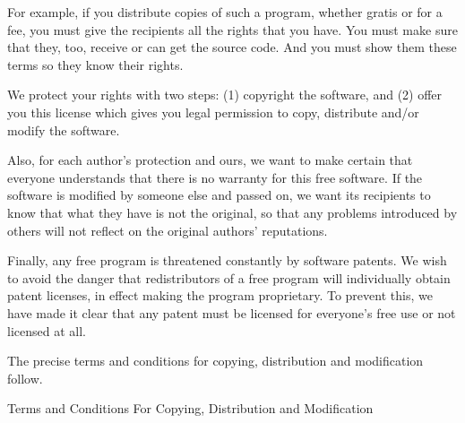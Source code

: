 \documentclass[12pt,a4paper]{article}
\begin{document}
For example, if you distribute copies of such a program, whether gratis or
for a fee, you must give the recipients all the rights that you have.  You
must make sure that they, too, receive or can get the source code.  And
you must show them these terms so they know their rights.

We protect your rights with two steps: (1) copyright the software, and (2)
offer you this license which gives you legal permission to copy,
distribute and/or modify the software.

Also, for each author's protection and ours, we want to make certain that
everyone understands that there is no warranty for this free software.  If
the software is modified by someone else and passed on, we want its
recipients to know that what they have is not the original, so that any
problems introduced by others will not reflect on the original authors'
reputations.

Finally, any free program is threatened constantly by software patents.
We wish to avoid the danger that redistributors of a free program will
individually obtain patent licenses, in effect making the program
proprietary.  To prevent this, we have made it clear that any patent must
be licensed for everyone's free use or not licensed at all.

The precise terms and conditions for copying, distribution and
modification follow.

\begin{center}
{\Large \sc Terms and Conditions For Copying, Distribution and
  Modification}
\end{center}
\end{document}
